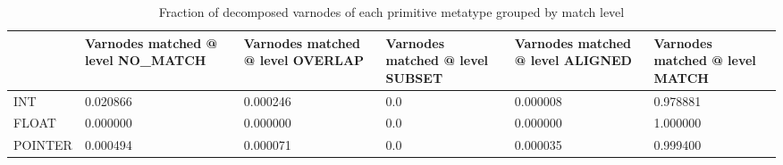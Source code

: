 \begin{table}[t]
\centering
\caption{Fraction of decomposed varnodes of each primitive metatype grouped by match level}
\label{table:metatype-match-levels-ratios-decomposed}
\begin{tabular}{lp{3.6cm}p{3.6cm}p{3.6cm}p{3.6cm}p{3.6cm}}
\toprule
{} &  Varnodes matched @ level NO\_MATCH &  Varnodes matched @ level OVERLAP &  Varnodes matched @ level SUBSET &  Varnodes matched @ level ALIGNED &  Varnodes matched @ level MATCH \\
\midrule
INT     &                           0.020866 &                          0.000246 &                              0.0 &                          0.000008 &                        0.978881 \\
FLOAT   &                           0.000000 &                          0.000000 &                              0.0 &                          0.000000 &                        1.000000 \\
POINTER &                           0.000494 &                          0.000071 &                              0.0 &                          0.000035 &                        0.999400 \\
\bottomrule
\end{tabular}
\end{table}

